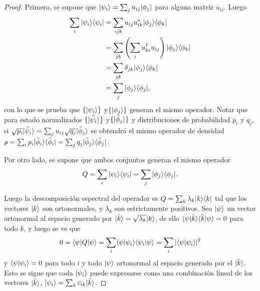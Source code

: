 \begin{proof}
	
	Primero, se supone que $|\psi_i\rangle= \sum_{j}u_{ij}|\phi_j\rangle$ para alguna matriz $u_{ij}$. Luego \begin{equation*}
		\begin{split}
			\sum_{i}|\psi_i\rangle \langle \psi_i|&=\sum_{ijk} u_{ij}u_{ik}^*|\phi_j\rangle \langle \phi_k|\\
			&=\sum_{jk}\left(\sum_i  u_{ki}^\dagger u_{ij}\right) |\phi_j\rangle \langle \phi_k|\\
			&=\sum_{jk}\delta_{jk}|\phi_j\rangle \langle \phi_k|\\
			&=\sum_{j} |\phi_j\rangle \langle \phi_j|,\\
	\end{split}
	\end{equation*}	
	con lo que se prueba que $\{|\psi_i\rangle\}$ y$ \{|\phi_j\rangle \}$ generan el mismo operador. Notar que para estado normalizados $\{|\tilde{\psi}_i\rangle\}$ y$ \{|\tilde{\phi}_j\rangle \}$ y distribuciones de probabilidad $p_i$ y $q_j$, si $\sqrt{p_i}|\tilde{\psi}_i\rangle=\sum_{j} u_{ij} \sqrt{q_j}|\tilde{\phi}_j\rangle$ se obtendrá el mismo operador de densidad $\rho=\sum_i p_i |\tilde{\phi}_i\rangle \langle\tilde{\phi}_i|= \sum_j q_j|\tilde{\phi}_j \rangle \langle\tilde{\phi}_j| $.
	
Por otro lado, se supone que
ambos conjuntos generan el mismo operador
\[Q=\sum_{i}|\psi_i\rangle \langle \psi_i|=\sum_{j} |\phi_j\rangle \langle \phi_j|.\]
	
Luego la  descomposición espectral del operador es $Q = \sum_k \lambda_k |k \rangle \langle k|$ tal que los vectores $ |k\rangle$ son ortonormales, y $\lambda_k$ son estrictamente  positivos. Sea $|\psi\rangle$  un vector ortonormal al espacio generado por $|\tilde{k}\rangle=\sqrt{\lambda_k}|k\rangle$, de ello $\langle \psi|\tilde{k}\rangle \langle \tilde{k}|\psi\rangle=0$ para todo $ k$, y luego se ve que 	\[0=\langle \psi |Q|\psi\rangle=\sum_{i}\langle\psi|\psi_i\rangle \langle \psi_i|\psi \rangle =\sum_i |\langle\psi|\psi_i\rangle|^2 \] y $\langle\psi|\psi_i\rangle=0$ para todo $i$ y todo $|\psi \rangle$ ortonormal al espacio generado  por el $|\tilde{k}\rangle$. Esto se sigue que cada $|\psi_i\rangle $ puede expresarse como una combinación lineal de los vectores  $|\tilde{k}\rangle$, $|\psi_i\rangle=\sum_k c_{ik} |\tilde{k}\rangle$. 
	

\end{proof}

